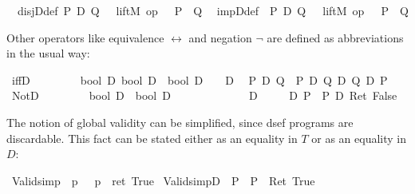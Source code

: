 \begin{isabellebody}
\ \ disjD{\isacharunderscore}def{\isacharcolon}\ {\isachardoublequote}P\ {\isasymor}\isactrlsub D\ Q\ {\isasymequiv}\ {\isasymUp}\ {\isacharparenleft}liftM{}\ {\isacharparenleft}op\ {\isasymor}{\isacharparenright}\ {\isacharparenleft}{\isasymDown}\ P{\isacharparenright}\ {\isacharparenleft}{\isasymDown}\ Q{\isacharparenright}{\isacharparenright}{\isachardoublequote}\isanewline
\ \ impD{\isacharunderscore}def{\isacharcolon}\ \ {\isachardoublequote}P\ {\isasymlongrightarrow}\isactrlsub D\ Q\ {\isasymequiv}\ {\isasymUp}\ {\isacharparenleft}liftM{}\ {\isacharparenleft}op\ {\isasymlongrightarrow}{\isacharparenright}\ {\isacharparenleft}{\isasymDown}\ P{\isacharparenright}\ {\isacharparenleft}{\isasymDown}\ Q{\isacharparenright}{\isacharparenright}{\isachardoublequote}\isanewline
\end{isabellebody}
Other operators like equivalence $\longleftrightarrow$ and negation
$\lnot$ are defined as abbreviations in the usual way:
\begin{isabellebody}
\isanewline
{}\isanewline
\ iffD\ \ \ \ \ \ \ \ {\isacharcolon}{\isacharcolon}\ {\isachardoublequote}{\isacharbrackleft}bool\ D{\isacharcomma}\ bool\ D{\isacharbrackright}\ {\isasymRightarrow}\ bool\ D{\isachardoublequote}\ \ \ {\isacharparenleft}\ {\isachardoublequote}{\isasymlongleftrightarrow}\isactrlsub D{\isachardoublequote}\ {}{}{\isacharparenright}\isanewline
\ {\isachardoublequote}P\ {\isasymlongleftrightarrow}\isactrlsub D\ Q\ {\isasymequiv}\ {\isacharparenleft}P\ {\isasymlongrightarrow}\isactrlsub D\ Q{\isacharparenright}\ {\isasymand}\isactrlsub D\ {\isacharparenleft}Q\ {\isasymlongrightarrow}\isactrlsub D\ P{\isacharparenright}{\isachardoublequote}\isanewline
\ NotD\ \ \ \ \ \ \ \ {\isacharcolon}{\isacharcolon}\ {\isachardoublequote}bool\ D\ {\isasymRightarrow}\ bool\ D{\isachardoublequote}\ \ \ \ \ \ \ \ \ \ \ \ \ \ {\isacharparenleft}{\isachardoublequote}{\isasymnot}\isactrlsub D\ {\isacharunderscore}{\isachardoublequote}\ {\isacharbrackleft}{}{}{\isacharbrackright}\ {}{}{\isacharparenright}\isanewline
\ \ {\isachardoublequote}{\isasymnot}\isactrlsub D\ P\ {\isasymequiv}\ P\ {\isasymlongrightarrow}\isactrlsub D\ Ret\ False{\isachardoublequote}\isamarkupfalse%
\isanewline
\end{isabellebody}
The notion of global validity can be simplified, since dsef programs are
discardable. This fact can be stated either as an equality in $T$ or as an
equality in $D$:
\begin{isabellebody}
  \isanewline
  \ Valid{\isacharunderscore}simp{\isacharcolon}\
  {\isachardoublequote}{\isacharparenleft}{\isasymturnstile}\
  p{\isacharparenright}\ {\isacharequal}\ {\isacharparenleft}{\isasymDown}\ p\
  {\isacharequal}\ ret\ True{\isacharparenright}{\isachardoublequote}\isanewline
  \isacommand{lemma}\ Valid{\isacharunderscore}simpD{\isacharcolon}\ {\isachardoublequote}{\isacharparenleft}{\isasymturnstile}\ P{\isacharparenright}\ {\isacharequal}\ {\isacharparenleft}P\ {\isacharequal}\ Ret\ True{\isacharparenright}{\isachardoublequote}\isanewline
\end{isabellebody}

